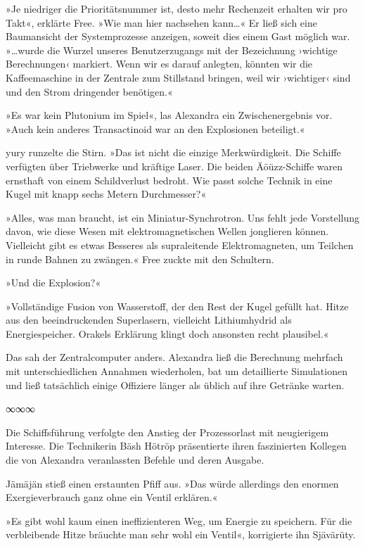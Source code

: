 »Je niedriger die Prioritätsnummer ist, desto mehr Rechenzeit erhalten wir pro Takt«, erklärte Free. »Wie man hier nachsehen kann…« Er ließ sich eine Baumansicht der Systemprozesse anzeigen, soweit dies einem Gast möglich war. »…wurde die Wurzel unseres Benutzerzugangs mit der Bezeichnung ›wichtige Berechnungen‹ markiert. Wenn wir es darauf anlegten, könnten wir die Kaffeemaschine in der Zentrale zum Stillstand bringen, weil wir ›wichtiger‹ sind und den Strom dringender benötigen.«

»Es war kein Plutonium im Spiel«, las Alexandra ein Zwischenergebnis vor. »Auch kein anderes Transactinoid war an den Explosionen beteiligt.«

yury runzelte die Stirn. »Das ist nicht die einzige Merkwürdigkeit. Die Schiffe verfügten über Triebwerke und kräftige Laser. Die beiden Äöüzz-Schiffe waren ernsthaft von einem Schildverlust bedroht. Wie passt solche Technik in eine Kugel mit knapp sechs Metern Durchmesser?«

»Alles, was man braucht, ist ein Miniatur-Synchrotron. Uns fehlt jede Vorstellung davon, wie diese Wesen mit elektromagnetischen Wellen jonglieren können. Vielleicht gibt es etwas Besseres als supraleitende Elektromagneten, um Teilchen in runde Bahnen zu zwängen.« Free zuckte mit den Schultern.

»Und die Explosion?«

»Vollständige Fusion von Wasserstoff, der den Rest der Kugel gefüllt hat. Hitze aus den beeindruckenden Superlasern, vielleicht Lithiumhydrid als Energiespeicher. Orakels Erklärung klingt doch ansonsten recht plausibel.«

Das sah der Zentralcomputer anders. Alexandra ließ die Berechnung mehrfach mit unterschiedlichen Annahmen wiederholen, bat um detaillierte Simulationen und ließ tatsächlich einige Offiziere länger als üblich auf ihre Getränke warten.

\begin{center}
∞∞∞
\end{center}

Die Schiffsführung verfolgte den Anstieg der Prozessorlast mit neugierigem Interesse. Die Technikerin Bäsh Hötröp präsentierte ihren faszinierten Kollegen die von Alexandra veranlassten Befehle und deren Ausgabe.

Jämäjän stieß einen erstaunten Pfiff aus. »Das würde allerdings den enormen Exergieverbrauch ganz ohne ein Ventil erklären.«

»Es gibt wohl kaum einen ineffizienteren Weg, um Energie zu speichern. Für die verbleibende Hitze bräuchte man sehr wohl ein Ventil«, korrigierte ihn Sjävärüty.

